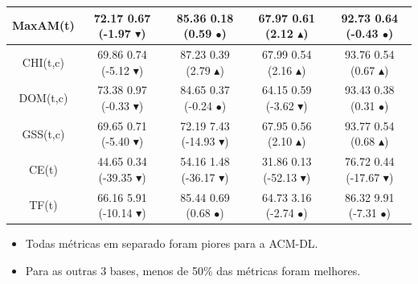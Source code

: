 \documentclass[10pt, red]{beamer}
\newcommand{\triangOK}{\textcolor[rgb]{00,0.45,0.10}{$\blacktriangle$}}
\newcommand{\triangBAD}{\textcolor[rgb]{0.7,00,00}{$\blacktriangledown$}}
\newcommand{\ball}{\textcolor[rgb]{0.7,0.70,0.0}{$\bullet$}}
\begin{document}
{\begin{table}[h]
\begin{adjustwidth}{-0.95cm}{-0.95cm}
\begin{tabular}{|c||c|c|c|c|}
\hline 
MaxAM(t) & 72.17 \textpm{} 0.67 (-1.97 \triangBAD) & 85.36 \textpm{} 0.18 (0.59 \ball) & 67.97 \textpm{} 0.61 (2.12 \triangOK) & 92.73 \textpm{} 0.64 (-0.43 \ball)\tabularnewline
\hline 
CHI(t,c) & 69.86 \textpm{} 0.74 (-5.12 \triangBAD) & 87.23 \textpm{} 0.39 (2.79 \triangOK) & 67.99 \textpm{} 0.54 (2.16 \triangOK) & 93.76 \textpm{} 0.54 (0.67 \triangOK)\tabularnewline
\hline 
DOM(t,c) & 73.38 \textpm{} 0.97 (-0.33 \triangBAD) & 84.65 \textpm{} 0.37 (-0.24 \ball) & 64.15 \textpm{} 0.59 (-3.62 \triangBAD) & 93.43 \textpm{} 0.38 (0.31 \ball)\tabularnewline
\hline 
GSS(t,c) & 69.65 \textpm{} 0.71 (-5.40 \triangBAD) & 72.19 \textpm{} 7.43 (-14.93 \triangBAD) & 67.95 \textpm{} 0.56 (2.10 \triangOK) & 93.77 \textpm{} 0.54 (0.68 \triangOK)\tabularnewline
\hline 
CE(t) & 44.65 \textpm{} 0.34 (-39.35 \triangBAD) & 54.16 \textpm{} 1.48 (-36.17 \triangBAD) & 31.86 \textpm{} 0.13 (-52.13 \triangBAD) & 76.72 \textpm{} 0.44 (-17.67 \triangBAD)\tabularnewline
\hline 
TF(t) & 66.16 \textpm{} 5.91 (-10.14 \triangBAD) & 85.44 \textpm{} 0.69 (0.68 \ball) & 64.73 \textpm{} 3.16 (-2.74 \ball) & 86.32 \textpm{} 9.91 (-7.31 \ball)\tabularnewline
\bottomrule
\end{tabular}
\end{adjustwidth}
\end{table}

\begin{itemize}
    \item Todas métricas em separado foram piores para a ACM-DL.
    \item Para as outras 3 bases, menos de 50\% das métricas foram melhores.  
\end{itemize}


}
\end{document}
